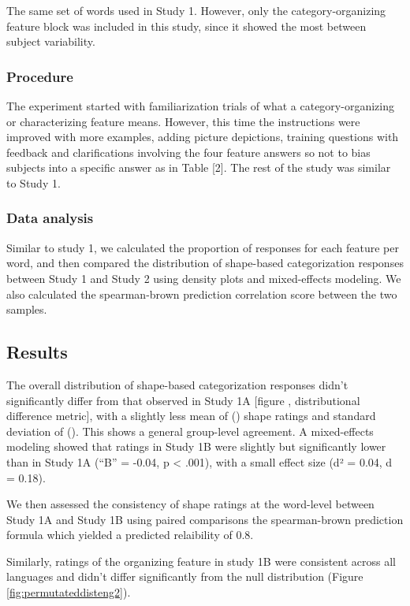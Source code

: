 \documentclass[
  american,
  man,floatsintext]{apa6}
\begin{document}
The same set of words used in Study 1. However, only the category-organizing feature block was included in this study, since it showed the most between subject variability.

\subsubsection{Procedure}\label{procedure-1}

The experiment started with familiarization trials of what a category-organizing or characterizing feature means. However, this time the instructions were improved with more examples, adding picture depictions, training questions with feedback and clarifications involving the four feature answers so not to bias subjects into a specific answer as in Table {[}2{]}. The rest of the study was similar to Study 1.

\subsubsection{Data analysis}\label{data-analysis-1}

Similar to study 1, we calculated the proportion of responses for each feature per word, and then compared the distribution of shape-based categorization responses between Study 1 and Study 2 using density plots and mixed-effects modeling. We also calculated the spearman-brown prediction correlation score between the two samples.

\subsection{Results}\label{results-1}

The overall distribution of shape-based categorization responses didn't significantly differ from that observed in Study 1A {[}figure , distributional difference metric{]}, with a slightly less mean of () shape ratings and standard deviation of (). This shows a general group-level agreement. A mixed-effects modeling showed that ratings in Study 1B were slightly but significantly lower than in Study 1A (``B'' = -0.04, p \textless{} .001), with a small effect size (d² = 0.04, d = 0.18).

We then assessed the consistency of shape ratings at the word-level between Study 1A and Study 1B using paired comparisons the spearman-brown prediction formula which yielded a predicted relaibility of 0.8.

Similarly, ratings of the organizing feature in study 1B were consistent across all languages and didn't differ significantly from the null distribution (Figure \ref{fig:permutateddisteng2}).
\end{document}
